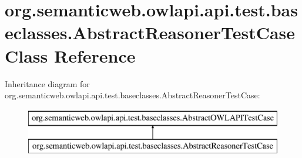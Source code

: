 \hypertarget{classorg_1_1semanticweb_1_1owlapi_1_1api_1_1test_1_1baseclasses_1_1_abstract_reasoner_test_case}{\section{org.\-semanticweb.\-owlapi.\-api.\-test.\-baseclasses.\-Abstract\-Reasoner\-Test\-Case Class Reference}
\label{classorg_1_1semanticweb_1_1owlapi_1_1api_1_1test_1_1baseclasses_1_1_abstract_reasoner_test_case}
}
Inheritance diagram for org.\-semanticweb.\-owlapi.\-api.\-test.\-baseclasses.\-Abstract\-Reasoner\-Test\-Case\-:\begin{figure}[H]
\begin{center}
\leavevmode
\includegraphics[height=2.000000cm]{classorg_1_1semanticweb_1_1owlapi_1_1api_1_1test_1_1baseclasses_1_1_abstract_reasoner_test_case}
\end{center}
\end{figure}
